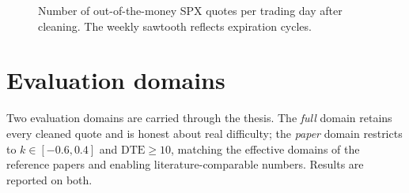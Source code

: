 \begin{figure}[t]
  \centering
  \caption[OTM quote density]{Number of out-of-the-money SPX quotes per trading day after cleaning. The weekly sawtooth reflects expiration cycles.}
  \label{fig:density}
\end{figure}

\section{Evaluation domains}\label{sec:domains}
Two evaluation domains are carried through the thesis. The \emph{full} domain retains every cleaned quote and is honest about real difficulty; the \emph{paper} domain restricts to $k\in[-0.6,0.4]$ and $\mathrm{DTE}\ge 10$, matching the effective domains of the reference papers and enabling literature-comparable numbers. Results are reported on both.
